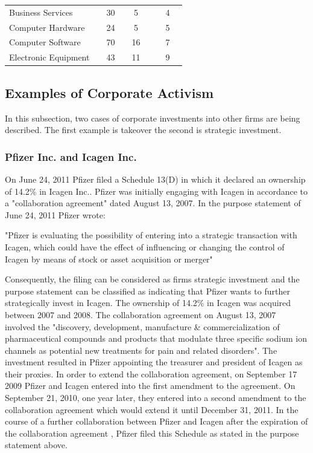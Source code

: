 \documentclass[12pt]{article}
\begin{document}
\begin{adjustwidth}{-6in}{-1in}
\begin{table}[htbp]
\begin{tabular}{lcclccllccc}
			Business Services &       & 30    &       & \multicolumn{2}{c}{5} &       &       & \multicolumn{2}{c}{4} &  \\
			Computer Hardware &       & 24    &       & \multicolumn{2}{c}{5} &       &       & \multicolumn{2}{c}{5} &  \\
			Computer Software &       & 70    &       & \multicolumn{2}{c}{16} &       &       & \multicolumn{2}{c}{7} &  \\
			Electronic Equipment &       & 43    &       & \multicolumn{2}{c}{11} &       &       & \multicolumn{2}{c}{9} &  \\
			\end{tabular}%
			\label{tab:addlabel}%
		\end{table}%
	\end{adjustwidth}

\pagebreak 

\subsection{Examples of Corporate Activism}
In this subsection, two cases of corporate investments into other firms are being described. The first example is takeover the second is strategic investment. 

\subsubsection{Pfizer Inc. and Icagen Inc. }
On June 24, 2011 Pfizer filed a Schedule 13(D) in which it declared an ownership of 14.2\% in Icagen Inc.. Pfizer was initially engaging with Icagen in accordance to a "collaboration agreement" dated August 13, 2007. In the purpose statement of June 24, 2011 Pfizer wrote: 
\begin{center}
	"Pfizer is evaluating the possibility of entering into a strategic transaction with Icagen, which could have the effect of influencing or changing the control of Icagen by means of stock or asset acquisition or merger"
\end{center}
Consequently, the filing can be considered as firms strategic investment and the purpose statement can be classified as indicating that Pfizer wants to further strategically invest in Icagen.
The ownership of 14.2\% in Icagen was acquired between 2007 and 2008. The collaboration agreement on August 13, 2007 involved the "discovery, development, manufacture \& commercialization of pharmaceutical compounds and products that modulate three specific sodium ion channels as potential new treatments for pain and related disorders". The investment resulted in Pfizer appointing the treasurer and president of Icagen as their proxies. 
In order to extend the collaboration agreement, on September 17 2009 Pfizer and Icagen entered into the first amendment to the agreement. 
On September 21, 2010, one year later, they entered into a second amendment to the collaboration agreement which would extend it until December 31, 2011. In the course of a further collaboration between Pfizer and Icagen after the expiration of the collaboration agreement , Pfizer filed this Schedule as stated in the purpose statement above.
\pagebreak
\end{document}
